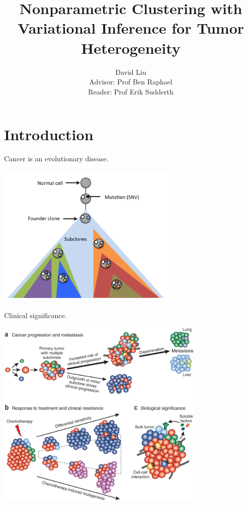 \documentclass{beamer}
\title{Nonparametric Clustering with \\ Variational Inference for Tumor Heterogeneity}
\author{David Liu \\[20pt] Advisor: Prof Ben Raphael \\ Reader: Prof Erik Sudderth}
\begin{document}
\begin{frame}
\titlepage
\end{frame}

\section{Introduction}
\begin{frame}{Cancer is an evolutionary disease.}
\centerline{\includegraphics[width=0.65\textwidth]{images/heterogeneity.png}}
\end{frame}

\begin{frame}{Clinical significance.}
\centerline{\includegraphics[width=0.75\textwidth]{images/heterogeneity_significance.jpg}}
\end{frame}
\end{document}
